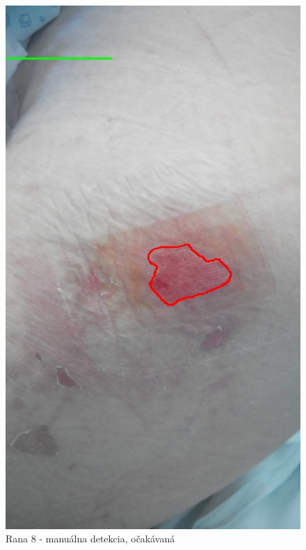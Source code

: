 \begin{figure}[h]
\begin{minipage}{0.48\textwidth}
     \includegraphics[scale=0.35]{fig/8m.jpeg}
      \caption{Rana 8 - manuálna detekcia, očakávaná}
      \label{fig:w8}
   \end{minipage}\hfill
   \begin{minipage}{0.48\textwidth}
     \centering

\end{minipage}
\end{figure}
